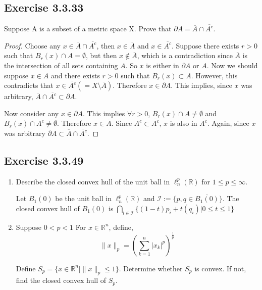 \documentclass{tufte-book}
\theoremstyle{mytheoremstyle}
\theoremstyle{mylemstyle}
\theoremstyle{mydefstyle}
\begin{document}
\subsection{Exercise 3.3.33}
Suppose A is a subset of a metric space X.  Prove that $\partial A = \overline{A} \cap \overline{A^c}$.

\begin{proof}
Choose any $x \in \overline{A} \cap \overline{A^c}$, then $x \in \overline{A}$ and $x \in \overline{A^c}$. Suppose there exists $r>0$ such that $B_r(x) \cap A = \emptyset$, but then $x \notin \overline{A}$, which is a contradiction since $\overline{A}$ is the intersection of all sets containing $A$.  So $x$ is either in $\partial{A}$ or $A$.  Now we should suppose $x \in A$ and there exists $r > 0$ such that $B_r(x) \subset A$.  However, this contradicts that $x \in \overline{A^c}(= X \setminus \overline{A})$.  Therefore $x \in \partial A$.  This implies, since $x$ was arbitrary, $\overline{A} \cap \overline{A^c} \subset \partial A$.

Now consider any $x \in \partial A$. This implies $\forall r>0$, $B_r(x) \cap A \neq \emptyset$ and $B_r(x) \cap A^c \neq \emptyset$.  Therefore $x \in \overline{A}$.  Since $A^c \subset \overline{A^c}$, $x$ is also in $\overline{A^c}$.  Again, since $x$ was arbitrary $\partial A \subset \overline{A} \cap \overline{A^c}$.

\end{proof}


\subsection{Exercise 3.3.49}
\begin{enumerate}
\item Describe the closed convex hull of the unit ball in $\ell_n^p(\mathbb{R})$ for $1 \leq p \leq \infty$.

Let $B_1(0)$ be the unit ball in $\ell_n^p(\mathbb{R})$ and $\mathcal{I} := \{p,q \in \overline{B_1(0)} \}$.  The closed convex hull of $B_1(0)$ is $\bigcap_{i \in \mathcal{I}} \{(1-t)p_i + t(q_i) | 0 \leq t \leq 1 \}$ 

\item Suppose $0 < p < 1$ For $x \in \mathbb{R}^n$, define,
\[ \|x\|_p = \left( \sum_{k=1}^n |x_k|^p \right)^\frac{1}{p} \]

Define $S_p = \{x \in \mathbb{R}^n | \|x\|_p \leq 1 \}$.  Determine whether $S_p$ is convex.  If not, find the closed convex hull of $S_p$.
\end{enumerate}
\end{document}
